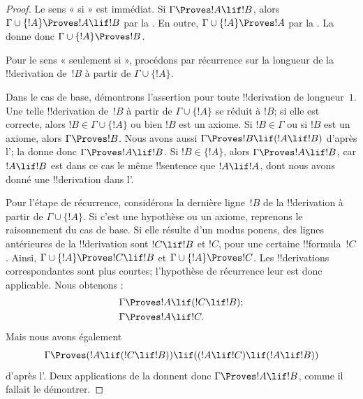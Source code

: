 \documentclass[../../../include/open-logic-section]{subfiles}
\begin{document}
\begin{proof}
Le sens « si » est immédiat. Si $\Gamma \Proves !A \lif !B$, alors
$\Gamma \cup \{!A\} \Proves !A \lif !B$ par la
. En outre,
$\Gamma \cup \{!A\} \Proves !A$ par la
. La  donne donc
$\Gamma \cup \{!A\} \Proves !B$.

Pour le sens « seulement si », procédons par récurrence sur la longueur
de la !!{derivation} de~$!B$ à partir de $\Gamma \cup \{!A\}$.

Dans le cas de base, démontrons l'assertion pour toute !!{derivation}
de longueur~$1$. Une telle !!{derivation} de~$!B$ à partir de
$\Gamma \cup \{!A\}$ se réduit à $!B$; si elle est correcte, alors
$!B \in \Gamma \cup \{!A\}$ ou bien $!B$ est un axiome. Si
$!B \in \Gamma$ ou si $!B$ est un axiome, alors
$\Gamma \Proves !B$. Nous avons aussi
$\Gamma \Proves !B \lif (!A \lif !B)$ d'après
l'; la  donne donc
$\Gamma \Proves !A \lif !B$. Si $!B \in \{!A\}$, alors
$\Gamma \Proves !A \lif !B$, car $!A \lif !B$ est dans ce cas le
même !!{sentence} que $!A \lif !A$, dont nous avons donné une
!!{derivation} dans l'.

Pour l'étape de récurrence, considérons la dernière ligne~$!B$ de
la !!{derivation} à partir de $\Gamma \cup \{!A\}$. Si c'est une
hypothèse ou un axiome, reprenons le raisonnement du cas de base.
Si elle résulte d'un modus ponens, des lignes antérieures de
la !!{derivation} sont $!C \lif !B$ et $!C$, pour une certaine
!!{formula}~$!C$. Ainsi,
$\Gamma \cup \{!A\} \Proves !C \lif !B$ et
$\Gamma \cup \{!A\} \Proves !C$. Les !!{derivation}s correspondantes
sont plus courtes; l'hypothèse de récurrence leur est donc applicable.
Nous obtenons :
\begin{align*}
  & \Gamma \Proves !A \lif (!C \lif !B); \\
  & \Gamma \Proves !A \lif !C.
\end{align*}
Mais nous avons également
\[
\Gamma \Proves (!A \lif (!C \lif !B)) \lif
((!A \lif !C) \lif (!A \lif !B))
\]
d'après l'. Deux applications de la
 donnent donc $\Gamma \Proves !A \lif !B$, comme il
fallait le démontrer.
\end{proof}
\end{document}

